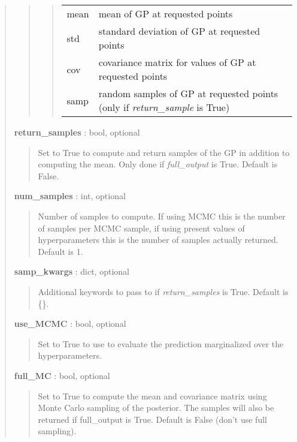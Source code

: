 \documentclass[letterpaper,10pt,english]{sphinxmanual}
\begin{document}
\begin{fulllineitems}
\begin{fulllineitems}
\begin{quote}
\begin{description}
\begin{quote}
\begin{quote}
\begin{tabulary}{\linewidth}{|L|L|}
mean
 & 
mean of GP at requested points
\\

std
 & 
standard deviation of GP at requested points
\\

cov
 & 
covariance matrix for values of GP at requested points
\\

samp
 & 
random samples of GP at requested points (only if \emph{return\_sample} is True)
\\
\hline\end{tabulary}

\end{quote}
\end{quote}

\textbf{return\_samples} : bool, optional
\begin{quote}

Set to True to compute and return samples of the GP in addition to
computing the mean. Only done if \emph{full\_output} is True. Default is
False.
\end{quote}

\textbf{num\_samples} : int, optional
\begin{quote}

Number of samples to compute. If using MCMC this is the number of
samples per MCMC sample, if using present values of hyperparameters
this is the number of samples actually returned. Default is 1.
\end{quote}

\textbf{samp\_kwargs} : dict, optional
\begin{quote}

Additional keywords to pass to {\hyperref[gptools:gptools.gaussian_process.GaussianProcess.draw_sample]{}} if
\emph{return\_samples} is True. Default is \{\}.
\end{quote}

\textbf{use\_MCMC} : bool, optional
\begin{quote}

Set to True to use {\hyperref[gptools:gptools.gaussian_process.GaussianProcess.predict_MCMC]{}} to evaluate the prediction
marginalized over the hyperparameters.
\end{quote}

\textbf{full\_MC} : bool, optional
\begin{quote}

Set to True to compute the mean and covariance matrix using Monte
Carlo sampling of the posterior. The samples will also be returned
if full\_output is True. Default is False (don't use full sampling).
\end{quote}


\end{description}
\end{quote}
\end{fulllineitems}
\end{fulllineitems}
\end{document}
